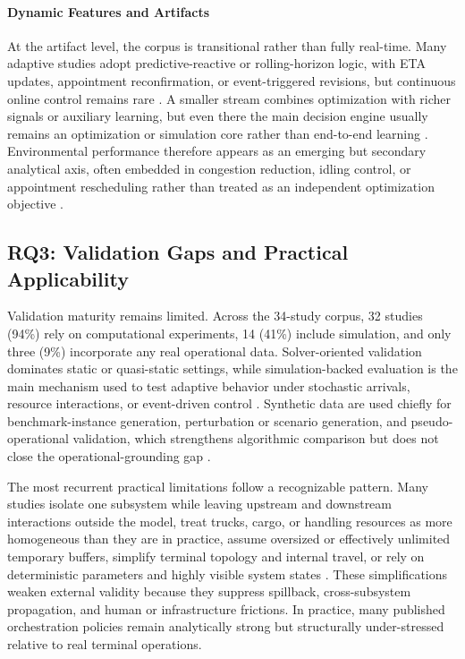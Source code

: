 \documentclass[preprint,12pt,number,longtitle]{elsarticle}
\begin{document}
\paragraph{Dynamic Features and Artifacts}
At the artifact level, the corpus is transitional rather than fully real-time. Many adaptive studies adopt predictive-reactive or rolling-horizon logic, with ETA updates, appointment reconfirmation, or event-triggered revisions, but continuous online control remains rare \cite{nasiri2022,fonseca2024,torbali2023,dasilva2023,banyai2025,modica2024,xu2022}. A smaller stream combines optimization with richer signals or auxiliary learning, but even there the main decision engine usually remains an optimization or simulation core rather than end-to-end learning \cite{dasilva2023,luan2025,nogueira2025}. Environmental performance therefore appears as an emerging but secondary analytical axis, often embedded in congestion reduction, idling control, or appointment rescheduling rather than treated as an independent optimization objective \cite{bouyahia2025,xu2021,xu2022,zhang2021,zhang2022}.

\subsection{RQ3: Validation Gaps and Practical Applicability}

Validation maturity remains limited. Across the 34-study corpus, 32 studies (94\%) rely on computational experiments, 14 (41\%) include simulation, and only three (9\%) incorporate any real operational data. Solver-oriented validation dominates static or quasi-static settings, while simulation-backed evaluation is the main mechanism used to test adaptive behavior under stochastic arrivals, resource interactions, or event-driven control \cite{cota2022,eti2025,fonseca2024,nogueira2025,vahdani2019,wang2023,zheng2026,abbas2018,li2010,torbali2023,zhang2022}. Synthetic data are used chiefly for benchmark-instance generation, perturbation or scenario generation, and pseudo-operational validation, which strengthens algorithmic comparison but does not close the operational-grounding gap \cite{bouyahia2025,modica2024,noh2025}.

The most recurrent practical limitations follow a recognizable pattern. Many studies isolate one subsystem while leaving upstream and downstream interactions outside the model, treat trucks, cargo, or handling resources as more homogeneous than they are in practice, assume oversized or effectively unlimited temporary buffers, simplify terminal topology and internal travel, or rely on deterministic parameters and highly visible system states \cite{bouyahia2025,noh2025,vahdani2019,cota2022,luan2025,zheng2026}. These simplifications weaken external validity because they suppress spillback, cross-subsystem propagation, and human or infrastructure frictions. In practice, many published orchestration policies remain analytically strong but structurally under-stressed relative to real terminal operations.
\end{document}
